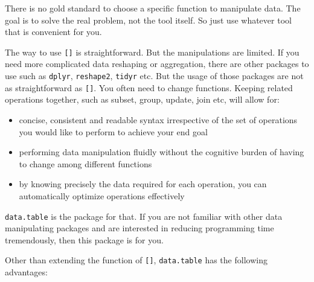 \documentclass[
  12pt,
]{krantz}
\makeatletter
\newenvironment{Shaded}{\begin{snugshade}}{\end{snugshade}}
\newcommand{\AttributeTok}[1]{\textcolor[rgb]{0.61,0.61,0.61}{#1}}
\newcommand{\FunctionTok}[1]{\textcolor[rgb]{0,0,0}{#1}}
\newcommand{\NormalTok}[1]{#1}
\newcommand{\SpecialCharTok}[1]{\textcolor[rgb]{0,0,0}{#1}}
\providecommand{\tightlist}{%
  \setlength{\itemsep}{0pt}\setlength{\parskip}{0pt}}
\newenvironment{kframe}{%
\medskip{}
\setlength{\fboxsep}{.8em}
 \def\at@end@of@kframe{}%
 \ifinner\ifhmode%
  \def\at@end@of@kframe{\end{minipage}}%
  \begin{minipage}{\columnwidth}%
 \fi\fi%
 \def\FrameCommand##1{\hskip\@totalleftmargin \hskip-\fboxsep
 \colorbox{shadecolor}{##1}\hskip-\fboxsep
     \hskip-\linewidth \hskip-\@totalleftmargin \hskip\columnwidth}%
 \MakeFramed {\advance\hsize-\width
   \@totalleftmargin\z@ \linewidth\hsize
   \@setminipage}}%
 {\par\unskip\endMakeFramed%
 \at@end@of@kframe}
\renewenvironment{Shaded}{\begin{kframe}}{\end{kframe}}
\makeatother
\begin{document}
\begin{Shaded}
\end{Shaded}

There is no gold standard to choose a specific function to manipulate data. The goal is to solve the real problem, not the tool itself. So just use whatever tool that is convenient for you.

The way to use \texttt{{[}{]}} is straightforward. But the manipulations are limited. If you need more complicated data reshaping or aggregation, there are other packages to use such as \texttt{dplyr}, \texttt{reshape2}, \texttt{tidyr} etc. But the usage of those packages are not as straightforward as \texttt{{[}{]}}. You often need to change functions. Keeping related operations together, such as subset, group, update, join etc, will allow for:

\begin{itemize}
\tightlist
\item
  concise, consistent and readable syntax irrespective of the set of operations you would like to perform to achieve your end goal
\item
  performing data manipulation fluidly without the cognitive burden of having to change among different functions
\item
  by knowing precisely the data required for each operation, you can automatically optimize operations effectively
\end{itemize}

\texttt{data.table} is the package for that. If you are not familiar with other data manipulating packages and are interested in reducing programming time tremendously, then this package is for you.

Other than extending the function of \texttt{{[}{]}}, \texttt{data.table} has the following advantages:
\end{document}
